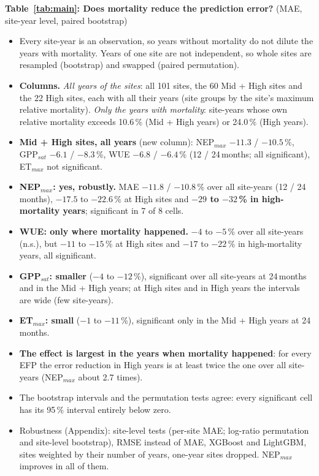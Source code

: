 \textbf{Table~\ref{tab:main}: Does mortality reduce the prediction error?} (MAE, site-year level, paired bootstrap)
\begin{itemize}
  \item Every site-year is an observation, so years without mortality do not dilute the years with mortality. Years of
        one site are not independent, so whole sites are resampled (bootstrap) and swapped (paired permutation).
  \item \textbf{Columns.} \emph{All years of the sites}: all 101 sites, the 60 Mid + High sites and the 22 High sites, each
        with all their years (site groups by the site's maximum relative mortality). \emph{Only the years with mortality}:
        site-years whose own relative mortality exceeds 10.6\,\% (Mid + High years) or 24.0\,\% (High years).
  \item \textbf{Mid + High sites, all years} (new column): NEP$_{max}$ $-11.3$ / $-10.5$\,\%, GPP$_{sat}$ $-6.1$ / $-8.3$\,\%,
        WUE $-6.8$ / $-6.4$\,\% (12 / 24\,months; all significant), ET$_{max}$ not significant.
  \item \textbf{NEP$_{max}$: yes, robustly.} MAE $-11.8$ / $-10.8$\,\% over all site-years (12 / 24\,months), $-17.5$ to
        $-22.6$\,\% at High sites and \textbf{$-29$ to $-32$\,\% in high-mortality years}; significant in 7 of 8 cells.
  \item \textbf{WUE: only where mortality happened.} $-4$ to $-5$\,\% over all site-years (n.s.), but $-11$ to $-15$\,\% at
        High sites and $-17$ to $-22$\,\% in high-mortality years, all significant.
  \item \textbf{GPP$_{sat}$: smaller} ($-4$ to $-12$\,\%), significant over all site-years at 24\,months and in the
        Mid + High years; at High sites and in High years the intervals are wide (few site-years).
  \item \textbf{ET$_{max}$: small} ($-1$ to $-11$\,\%), significant only in the Mid + High years at 24\,months.
  \item \textbf{The effect is largest in the years when mortality happened}: for every EFP the error reduction in High
        years is at least twice the one over all site-years (NEP$_{max}$ about 2.7 times).
  \item The bootstrap intervals and the permutation tests agree: every significant cell has its 95\,\% interval entirely
        below zero.
  \item Robustness (Appendix): site-level tests (per-site MAE; log-ratio permutation and site-level bootstrap), RMSE
        instead of MAE, XGBoost and LightGBM, sites weighted by their number of years, one-year sites dropped. NEP$_{max}$
        improves in all of them.
\end{itemize}

